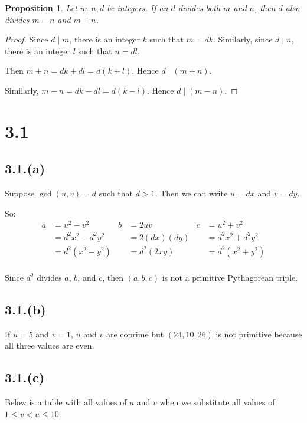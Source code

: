 \documentclass[letterpaper, 12pt]{article}
\theoremstyle{mystyle}
\newtheorem*{prop}{Proposition}
\begin{document}
\begin{prop}
    Let $m,n, d$ be integers. If an $d$ divides both $m$ and $n$, then $d$ also
    divides $m-n$ and $m+n$.
\end{prop}

\begin{proof}
    Since $d \mid m$, there is an integer $k$ such that $m = dk$. Similarly,
    since $d \mid n$, there is an integer $l$ such that $n = dl$.
    
    Then $m+n = dk+dl = d(k+l)$. Hence $d \mid (m+n)$.
    
    Similarly, $m-n = dk-dl = d(k-l)$. Hence $d \mid (m-n)$.
\end{proof}


\section*{3.1}

\subsection*{3.1.(a)}
Suppose $\gcd(u,v) = d$ such that $d > 1$. Then we can write $u = dx$ and 
$v = dy$.

So:
\begin{align*}
    a &= u^2 - v^2          & b &= 2uv          & c &= u^2 + v^2\\
      &= d^2 x^2 - d^2 y^2  &   &= 2(dx)(dy)    &   &= d^2 x^2 + d^2 y^2\\
      &= d^2(x^2 - y^2)     &   &= d^2 (2xy)    &   &= d^2 (x^2 + y^2) \\
\end{align*}

Since $d^2$ divides $a$, $b$, and $c$, then $(a,b,c)$ is not a primitive
Pythagorean triple.

\subsection*{3.1.(b)}
If $u = 5$ and $v = 1$, $u$ and $v$ are coprime but $(24, 10, 26)$ is not 
primitive because all three values are even.

\subsection*{3.1.(c)}
Below is a table with all values of $u$ and $v$ when we substitute all values
of ${1 \leq v < u \leq 10}$.
\end{document}
